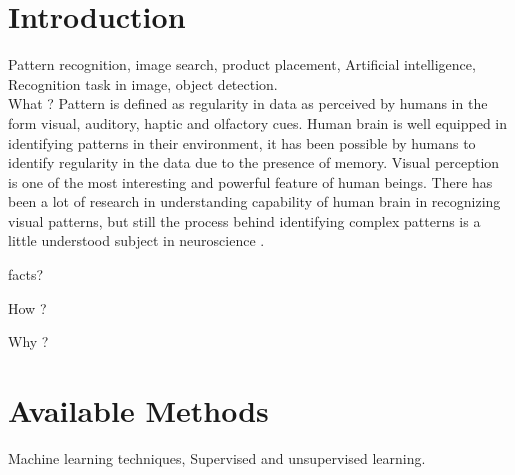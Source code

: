 \section{Introduction}
 Pattern recognition, image search, product placement,
 Artificial intelligence, Recognition task in image, object detection.
 \\
 What ?
 Pattern is defined as regularity in data as perceived by humans in the form visual, auditory, haptic and olfactory cues. Human brain is well equipped in identifying patterns in their environment, it has been  possible by humans to identify regularity in the data due to the presence of memory. Visual perception is one of the most interesting and powerful feature of human beings. 
 There has been a lot of research in understanding capability of human brain in recognizing visual patterns, but still the process behind identifying complex patterns is a little understood subject in neuroscience \cite{sinha2002recognizing}.
 
 facts? 
 
 How ?
 
 Why ?  
             	   
 
\section{Available Methods}
Machine learning techniques, 
Supervised and unsupervised learning.


